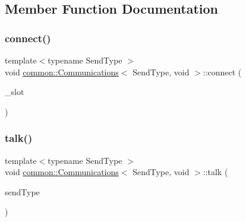 \subsection{Member Function Documentation}
\mbox{\label{classcommon_1_1Communications_3_01SendType_00_01void_01_4_a421016a95514d984951d538a6f24223d}} 
\subsubsection{\texorpdfstring{connect()}{connect()}}
{\footnotesize\ttfamily template$<$typename Send\+Type $>$ \\
void \mbox{\hyperlink{classcommon_1_1Communications}{common\+::\+Communications}}$<$ Send\+Type, void $>$\+::connect (\begin{DoxyParamCaption}\item[{\mbox{\hyperlink{classcommon_1_1Communications_3_01SendType_00_01void_01_4_afd0ffbe5cd762b7a03402664b19a69aa}{slot\+\_\+type}} const \&}]{\+\_\+slot }\end{DoxyParamCaption})\hspace{0.3cm}{\ttfamily [inline]}}

\mbox{\label{classcommon_1_1Communications_3_01SendType_00_01void_01_4_aa23c4fc34c4862dee8dc95e62f1c76e3}} 
\subsubsection{\texorpdfstring{talk()}{talk()}}
{\footnotesize\ttfamily template$<$typename Send\+Type $>$ \\
void \mbox{\hyperlink{classcommon_1_1Communications}{common\+::\+Communications}}$<$ Send\+Type, void $>$\+::talk (\begin{DoxyParamCaption}\item[{Send\+Type const \&}]{send\+Type }\end{DoxyParamCaption})\hspace{0.3cm}{\ttfamily [inline]}}



